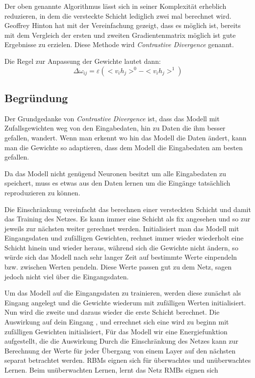 Der oben genannte Algorithmus lässt sich in seiner Komplexität erheblich reduzieren, in dem die versteckte Schicht lediglich zwei mal berechnet wird. Geoffrey Hinton hat mit der Vereinfachung gezeigt, dass es möglich ist, bereits mit dem Vergleich der ersten und zweiten Gradientenmatrix möglich ist gute Ergebnisse zu erzielen. Diese Methode wird \emph{Contrastive Divergence} genannt.

Die Regel zur Anpassung der Gewichte lautet dann:
$$\Delta\omega_{ij} = \varepsilon (<v_ih_j>^0 -  <v_ih_j>^1)$$

\subsection{Begründung}

Der Grundgedanke von \emph{Contrastive Divergence} ist, dass das Modell mit Zufallsgewichten weg von den Eingabedaten, hin zu Daten die ihm besser gefallen, wandert. Wenn man erkennt wo hin das Modell die Daten ändert, kann man die Gewichte so adaptieren, dass dem Modell die Eingabedaten am besten gefallen.

Da das Modell nicht genügend Neuronen besitzt um alle Eingabedaten zu speichert, muss es etwas aus den Daten lernen um die Eingänge tatsächlich reproduzieren zu können.



Die Einschränkung vereinfacht das berechnen einer versteckten Schicht und damit das Training des Netzes. Es kann immer eine Schicht als fix angesehen und so zur jeweils zur nächsten weiter gerechnet werden. Initialisiert man das Modell mit Eingangsdaten und zufälligen Gewichten, rechnet immer wieder wiederholt eine Schicht hinein und wieder heraus, während sich die Gewichte nicht ändern, so würde sich das Modell nach sehr langer Zeit auf bestimmte Werte einpendeln bzw. zwischen Werten pendeln. Diese Werte passen gut zu dem Netz, sagen jedoch nicht viel über die Eingangsdaten.

Um das Modell auf die Eingangsdaten zu trainieren, werden diese zunächst als Eingang angelegt und die Gewichte wiederum mit zufälligen Werten initialisiert. Nun wird die zweite und daraus wieder die erste Schicht berechnet. Die Auswirkung auf dein Eingang 
 , und errechnet sich eine wird zu beginn mit zufälligen Gewichten initialisiert, 
 Für das Modell wir eine Energiefunktion aufgestellt, die die Auswirkung Durch die Einschränkung des Netzes kann zur Berechnung der Werte für jeder Übergang von einem Layer auf den nächsten separat betrachtet werden. 
RBMs eignen sich für überwachtes und unüberwachtes Lernen. Beim unüberwachten Lernen, lernt das Netz 
RMBs eignen sich 

